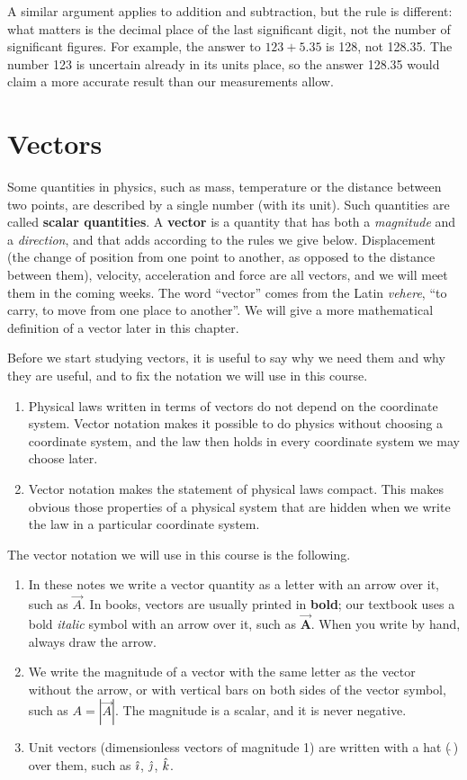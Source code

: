 \documentclass[11pt,a4paper]{article}
\begin{document}
A similar argument applies to addition and subtraction, but the rule is different: what matters is
the decimal place of the last significant digit, not the number of significant figures. For
example, the answer to $123 + 5.35$ is 128, not 128.35. The number 123 is uncertain already in its
units place, so the answer 128.35 would claim a more accurate result than our measurements allow.

\section{Vectors}

Some quantities in physics, such as mass, temperature or the distance between two points, are
described by a single number (with its unit). Such quantities are called \textbf{scalar
quantities}. A \textbf{vector} is a quantity that has both a \emph{magnitude} and a
\emph{direction}, and that adds according to the rules we give below. Displacement (the change of
position from one point to another, as opposed to the distance between them), velocity,
acceleration and force are all vectors, and we will meet them in the coming weeks. The word
``vector'' comes from the Latin \emph{vehere}, ``to carry, to move from one place to another''.
We will give a more mathematical definition of a vector later in this chapter.

Before we start studying vectors, it is useful to say why we need them and why they are useful,
and to fix the notation we will use in this course.
\begin{enumerate}
  \item Physical laws written in terms of vectors do not depend on the coordinate system. Vector
    notation makes it possible to do physics without choosing a coordinate system, and the law
    then holds in every coordinate system we may choose later.
  \item Vector notation makes the statement of physical laws compact. This makes obvious those
    properties of a physical system that are hidden when we write the law in a particular
    coordinate system.
\end{enumerate}
The vector notation we will use in this course is the following.
\begin{enumerate}
  \item In these notes we write a vector quantity as a letter with an arrow over it, such as
    $\vec{A}$. In books, vectors are usually printed in \textbf{bold}; our textbook uses a bold
    \emph{italic} symbol with an arrow over it, such as $\vec{\bm{A}}$. When you write by hand, always draw the arrow.
  \item We write the magnitude of a vector with the same letter as the vector without the arrow,
    or with vertical bars on both sides of the vector symbol, such as $A = |\vec{A}|$. The
    magnitude is a scalar, and it is never negative.
  \item Unit vectors (dimensionless vectors of magnitude 1) are written with a hat
    ($\hat{\ }$) over them, such as $\hat{\imath}$, $\hat{\jmath}$, $\hat{k}$.
\end{enumerate}
\end{document}
